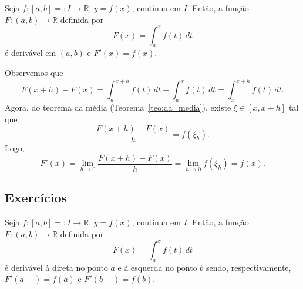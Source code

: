 \begin{teo}\label{teo:teo_fundamental_do_calculo}
  Seja $f:[a, b]=:I\to\mathbb{R}$, $y=f(x)$, contínua em $I$. Então, a função $F:(a, b)\to\mathbb{R}$ definida por
  \begin{equation}
    F(x) = \int_a^x f(t)\,dt
  \end{equation}
é derivável em $(a, b)$ e $F'(x) = f(x)$.
\end{teo}
\begin{dem}
  Observemos que
  \begin{equation}
    F(x+h)-F(x) = \int_{a}^{x+h}f(t)\,dt - \int_{a}^x f(t)\,dt = \int_x^{x+h}f(t)\,dt.
  \end{equation}
Agora, do teorema da média (Teorema~\ref{teo:da_media}), existe $\xi \in [x, x+h]$ tal que
\begin{equation}
  \frac{F(x+h)-F(x)}{h} = f(\xi_{h}).
\end{equation}
Logo,
\begin{equation}
  F'(x) = \lim_{h\to 0}\frac{F(x+h)-F(x)}{h} = \lim_{h\to 0}f(\xi_{h}) = f(x).
\end{equation}
\end{dem}

\subsection*{Exercícios}

\begin{exer}
  Seja $f:[a, b]=:I\to\mathbb{R}$, $y=f(x)$, contínua em $I$. Então, a função $F:(a, b)\to\mathbb{R}$ definida por
  \begin{equation}
    F(x) = \int_a^x f(t)\,dt
  \end{equation}
é derivável à direta no ponto $a$ e à esquerda no ponto $b$ sendo, respectivamente, $F'(a+) = f(a)$ e $F'(b-) = f(b)$.
\end{exer}